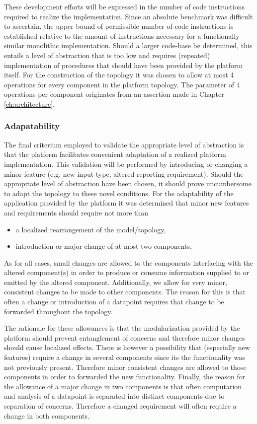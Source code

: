 These development efforts will be expressed in the number of code instructions required to realize the implementation. Since an absolute benchmark was difficult to ascertain, the upper bound of permissible number of code instructions is established relative to the amount of instructions necessary for a functionally similar monolithic implementation. Should a larger code-base be determined, this entails a level of abstraction that is too low and requires (repeated) implementation of procedures that should have been provided by the platform itself. For the construction of the topology it was chosen to allow at most 4 operations for every component in the platform topology. The parameter of 4 operations per component originates from an assertion made in Chapter \ref{ch:architecture}.

\subsubsection{Adapatability}
The final criterium employed to validate the appropriate level of abstraction is that the platform facilitates convenient adaptation of a realized platform implementation. This validation will be performed by introducing or changing a minor feature (e.g. new input type, altered reporting requirement). Should the appropriate level of abstraction have been chosen, it should prove uncumbersome to adapt the topology to these novel conditions. For the adaptability of the application provided by the platform it was determined that minor new features and requirements should require not more than
\begin{itemize}
\nospace
\item a localized rearrangement of the model/topology, 
\item introduction or major change of at most two components, 
\end{itemize}
As for all cases, small changes are allowed to the components interfacing with the altered component(s) in order to produce or consume information supplied to or emitted by the altered component. Additionally, we allow for very minor, consistent changes to be made to other components. The reason for this is that often a change or introduction of a datapoint requires that change to be forwarded throughout the topology.

The rationale for these allowances is that the modularization provided by the platform should prevent entanglement of concerns and therefore minor changes should cause localized effects. There is however a possibility that (especially new features) require a change in several components since its the functionality was not previously present. Therefore minor consistent changes are allowed to those components in order to forwarded the new functionality. Finally, the reason for the allowance of a major change in two components is that often computation and analysis of a datapoint is separated into distinct components due to separation of concerns. Therefore a changed requirement will often require a change in both components.

